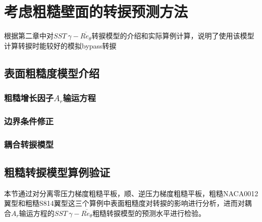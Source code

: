 
\chapter{考虑粗糙壁面的转捩预测方法}
根据第二章中对$SST~\gamma-\overline{Re_\theta}$转捩模型的介绍和实际算例计算，说明了使用该模型计算转捩时能较好的模拟bypass转捩
 
\section{表面粗糙度模型介绍}
\subsection{粗糙增长因子$A_r$输运方程}
\subsection{边界条件修正}
\subsection{耦合转捩模型}

\section{粗糙转捩模型算例验证}
本节通过对分离零压力梯度粗糙平板，顺、逆压力梯度粗糙平板，粗糙NACA0012翼型和粗糙S814翼型这三个算例中表面粗糙度对转捩的影响进行分析，进而对耦合$A_r$输运方程的$SST~\gamma-\overline{Re_\theta}$粗糙转捩模型的预测水平进行检验。
